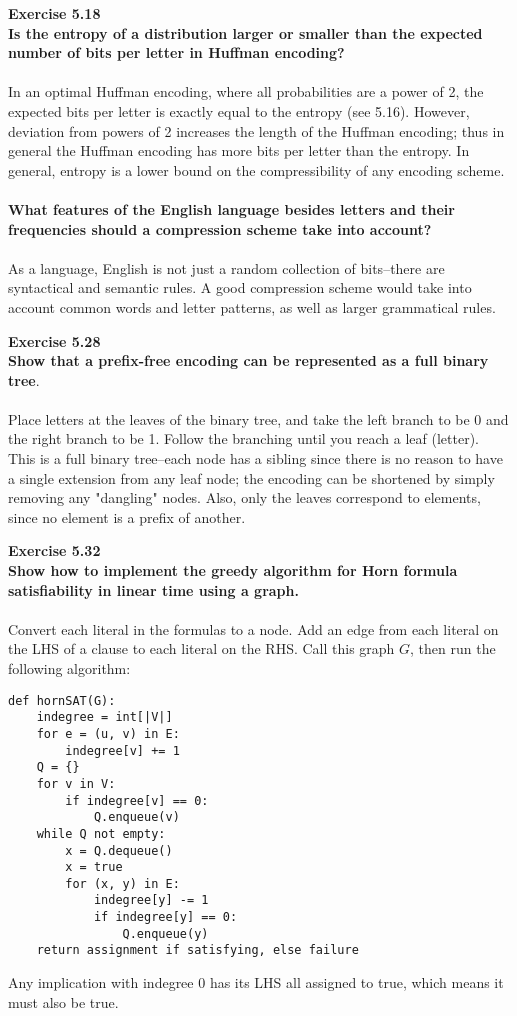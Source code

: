 \documentclass{article}
\newenvironment{problem}[2][Exercise]
    { \begin{mdframed}[backgroundcolor=gray!20] \textbf{#1 #2} \\}
    {  \end{mdframed}}
\begin{document}
\begin{problem}{5.18}
\textbf{Is the entropy of a distribution larger or smaller than the expected number of bits per letter in Huffman encoding?}
\\
\\
In an optimal Huffman encoding, where all probabilities are a power of 2, the expected bits per letter is exactly equal to the entropy (see 5.16). However, deviation from powers of 2 increases the length of the Huffman encoding; thus in general the Huffman encoding has more bits per letter than the entropy. In general, entropy is a lower bound on the compressibility of any encoding scheme.
\\
\\
\textbf{What features of the English language besides letters and their frequencies should a compression scheme take into account?}
\\
\\
As a language, English is not just a random collection of bits--there are syntactical and semantic rules. A good compression scheme would take into account common words and letter patterns, as well as larger grammatical rules.
\end{problem}

\begin{problem}{5.28}
\textbf{Show that a prefix-free encoding can be represented as a full binary tree}.
\\
\\
Place letters at the leaves of the binary tree, and take the left branch to be 0 and the right branch to be 1. Follow the branching until you reach a leaf (letter).
\\
This is a full binary tree--each node has a sibling since there is no reason to have a single extension from any leaf node; the encoding can be shortened by simply removing any "dangling" nodes. Also, only the leaves correspond to elements, since no element is a prefix of another.
\end{problem}

\begin{problem}{5.32}
\textbf{Show how to implement the greedy algorithm for Horn formula satisfiability in linear time using a graph.}
\\
\\
Convert each literal in the formulas to a node. Add an edge from each literal on the LHS of a clause to each literal on the RHS. Call this graph $G$, then run the following algorithm:
\begin{lstlisting}[mathescape=true]
def hornSAT(G):
    indegree = int[|V|]
    for e = (u, v) in E:
        indegree[v] += 1
    Q = {}
    for v in V:
        if indegree[v] == 0:
            Q.enqueue(v)
    while Q not empty:
        x = Q.dequeue()
        x = true
        for (x, y) in E:
            indegree[y] -= 1
            if indegree[y] == 0:
                Q.enqueue(y)
    return assignment if satisfying, else failure            
\end{lstlisting}
Any implication with indegree 0 has its LHS all assigned to true, which means it must also be true.
\end{problem}
\end{document}
